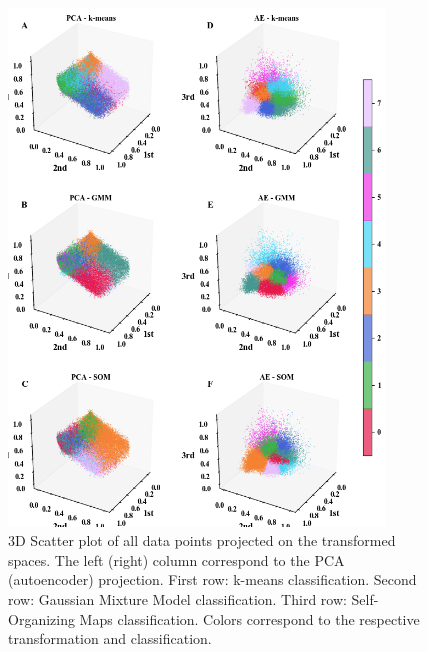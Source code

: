 \documentclass[utf8]{frontiersSCNS} %
\begin{document}
\begin{figure}[h!]
	\begin{center}
		\includegraphics[width=10cm]{clustering}%
	\end{center}
	\caption{3D Scatter plot of all data points projected on the transformed spaces. The left (right) column correspond to the PCA (autoencoder) projection. First row: k-means classification. Second row: Gaussian Mixture Model classification. Third row: Self-Organizing Maps classification. Colors correspond to the respective transformation and classification.}\label{fig:clustering}
\end{figure}
\end{document}
